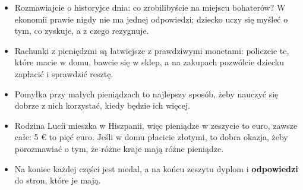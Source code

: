 {\small
\begin{itemize}[leftmargin=6mm, itemsep=1pt, topsep=2pt]
\item Rozmawiajcie o historyjce dnia: co zrobilibyście na miejscu
  bohaterów? W ekonomii prawie nigdy nie ma jednej odpowiedzi; dziecko
  uczy się myśleć o tym, co zyskuje, a z czego rezygnuje.
\item Rachunki z pieniędzmi są łatwiejsze z prawdziwymi monetami:
  policzcie te, które macie w domu, bawcie się w sklep, a na zakupach
  pozwólcie dziecku zapłacić i sprawdzić resztę.
\item Pomyłka przy małych pieniądzach to najlepszy sposób, żeby nauczyć
  się dobrze z nich korzystać, kiedy będzie ich więcej.
\item Rodzina Lucíi mieszka w Hiszpanii, więc pieniądze w zeszycie to
  euro, zawsze całe: 5 € to pięć euro. Jeśli w domu płacicie złotymi, to
  dobra okazja, żeby porozmawiać o tym, że różne kraje mają różne
  pieniądze.
\item Na koniec każdej części jest medal, a na końcu zeszytu dyplom i
  \textbf{odpowiedzi} do stron, które je mają.
\end{itemize}}
\newpage
